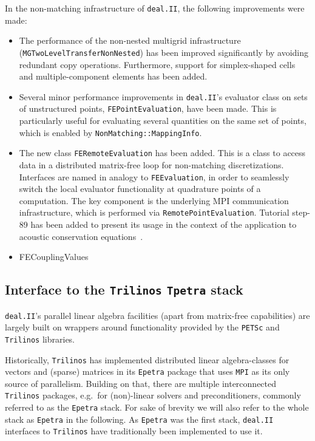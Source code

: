 \documentclass{ansarticle-preprint}
\newcommand{\specialword}[1]{\texttt{#1}}
\newcommand{\dealii}{{\specialword{deal.II}}\xspace}
\newcommand{\trilinos}{{\specialword{Trilinos}}\xspace}
\newcommand{\petsc}{\specialword{PETSc}\xspace}
\newcommand{\MPI}{{\specialword{MPI}}\xspace}
\newcommand{\epetra}{{\specialword{Epetra}}\xspace}
\newcommand{\tpetra}{{\specialword{Tpetra}}\xspace}
\begin{document}

In the non-matching infrastructure of \dealii, the following improvements were made:

\begin{itemize}
\item The performance of the non-nested multigrid infrastructure
(\texttt{MGTwoLevelTransferNon\-Nested}) has been improved significantly by avoiding
redundant copy operations. Furthermore, support for simplex-shaped cells and
multiple-component elements has been added.
\item Several minor performance improvements in \dealii's evaluator class on
  sets of unstructured points, \texttt{FEPointEvaluation}, have been
  made. This is particularly useful for evaluating several quantities on the
  same set of points, which is enabled by \texttt{NonMatching::MappingInfo}.
\item The new class \texttt{FERemoteEvaluation} has been added.
This is a class to access data
in a distributed matrix-free loop for non-matching discretizations.
Interfaces are named in analogy to \texttt{FEEvaluation}, in order to seamlessly switch the
local evaluator functionality at quadrature points of a computation. The key component is the
underlying MPI communication infrastructure, which is performed via \texttt{RemotePointEvaluation}.
Tutorial step-89 has been added to present its usage
in the context of the application to acoustic conservation equations~\cite{heinz2023high}.
\item FECouplingValues

\end{itemize}

\subsection{Interface to the \trilinos{} \tpetra{} stack}\label{sec:tpetra}

\dealii{}'s parallel linear algebra facilities (apart from matrix-free capabilities) are largely built on
wrappers around functionality provided by the \petsc{} and \trilinos{} libraries.

Historically, \trilinos{} has implemented distributed linear algebra-classes for vectors and (sparse) matrices in its
\epetra{} package that uses \MPI{} as its only source of
parallelism. Building on that, there are multiple interconnected \trilinos{} packages, e.g.\ for (non)-linear solvers 
and preconditioners, commonly referred to as the 
\epetra{} stack. For sake of brevity we will also refer to the whole stack as \epetra{} in the following.
As \epetra{} was the first stack, \dealii{} interfaces to \trilinos{} have traditionally 
been implemented to use it.
\end{document}
